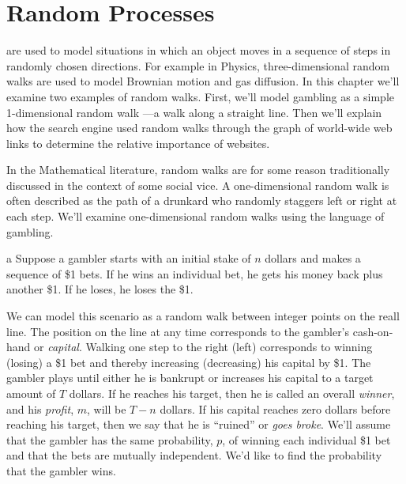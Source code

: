 \chapter{Random Processes}\label{ran_process_chap}

 are used to model situations in which an object moves
in a sequence of steps in randomly chosen directions.  For example in
Physics, three-dimensional random walks are used to model Brownian motion
and gas diffusion.  In this chapter we'll examine two examples of random
walks.  First, we'll model gambling as a simple 1-dimensional random walk
---a walk along a straight line.  Then we'll explain how the 
search engine used random walks through the graph of world-wide web links
to determine the relative importance of websites.



\begin{editingnotes}
In the Mathematical literature, random walks are for some reason
traditionally discussed in the context of some social vice.  A
one-dimensional random walk is often described as the path of a drunkard
who randomly staggers left or right at each step.  We'll examine
one-dimensional random walks using the language of gambling.
\end{editingnotes}
a
Suppose a gambler starts with an initial stake of $n$ dollars and makes a
sequence of \$1 bets.  If he wins an individual bet, he gets his money
back plus another \$1.  If he loses, he loses the \$1.  

We can model this scenario as a random walk between integer points on
the reall line.  The position on the line at any time corresponds to
the gambler's cash-on-hand or \emph{capital}.  Walking one step to the
right (left) corresponds to winning (losing) a \$1 bet and thereby
increasing (decreasing) his capital by \$1.  The gambler plays until
either he is bankrupt or increases his capital to a target amount of
$T$ dollars.  If he reaches his target, then he is called an overall
\emph{winner}, and his \emph{profit}, $m$, will be $T-n$ dollars.  If
his capital reaches zero dollars before reaching his target, then we
say that he is ``ruined'' or \emph{goes broke}.  We'll assume that the
gambler has the same probability, $p$, of winning each individual \$1
bet and that the bets are mutually independent.  We'd like to find the
probability that the gambler wins.

